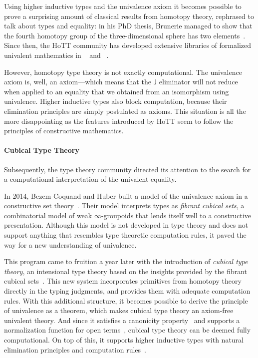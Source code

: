 Using higher inductive types and the univalence axiom it becomes possible to 
prove a surprising amount of classical results from homotopy theory, rephrased
to talk about types and equality:
% 
in his PhD thesis, Brunerie managed to show that the fourth homotopy group of
the three-dimensional sphere has two elements~.
% 
Since then, the HoTT community has developed extensive libraries of formalized
univalent mathematics in \Coq~ and
\Agda~.

However, homotopy type theory is not exactly computational. The univalence
axiom is, well, an axiom---which means that the \( \mathsf{J} \) eliminator
will not reduce when applied to an equality that we obtained from an 
isomorphism using univalence.
% 
Higher inductive types also block computation, because their elimination 
principles are simply postulated as axioms.
% 
This situation is all the more disappointing as the features introduced by HoTT
seem to follow the principles of constructive mathematics.

\paragraph*{Cubical Type Theory}
% 
Subsequently, the type theory community directed its attention to the
search for a computational interpretation of the univalent equality. 

In 2014, Bezem Coquand and Huber built a model of the univalence axiom in a constructive 
set theory~.
% 
Their model interprets types as \emph{fibrant cubical sets}, a combinatorial
model of weak \( \infty \)-groupoids that lends itself well to a constructive
presentation.
% 
Although this model is not developed in type theory and does not support 
anything that resembles type theoretic computation rules, it paved the way 
for a new understanding of univalence.

This program came to fruition a year later with the introduction of 
\emph{cubical type theory}, an intensional type theory based on the insights 
provided by the fibrant cubical sets~.
% 
This new system incorporates primitives from homotopy theory directly in the typing 
judgments, and provides them with adequate computation rules.
% 
With this additional structure, it becomes possible to derive the principle of 
univalence as a theorem, which makes cubical type theory an axiom-free univalent 
theory.
% 
And since it satisfies a canonicity property~ and supports a
normalization function for open terms~, 
cubical type theory can be deemed fully computational.
% 
On top of this, it supports higher inductive types with
natural elimination principles and computation rules~.

